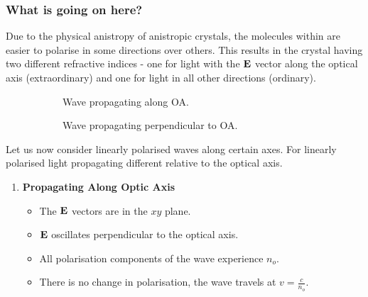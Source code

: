 \documentclass{book}
\begin{document}
{\subsubsection{What is going on here?}
Due to the physical anistropy of anistropic crystals, the molecules within are easier to polarise in some directions over others. This results in the crystal having two different refractive indices - one for light with the $\vb{E}$ vector along the optical axis (extraordinary) and one for light in all other directions (ordinary).
\begin{figure}
	\centering
	\begin{subfigure}{0.4\textwidth}
	\caption{Wave propagating along OA.}
	\end{subfigure}
	\begin{subfigure}{0.4\textwidth}
	\caption{Wave propagating perpendicular to OA.}
	\end{subfigure}
	\caption{}
\end{figure}
\noindent
Let us now consider linearly polarised waves along certain axes. For linearly polarised light propagating different relative to the optical axis.
\begin{enumerate}
	\item \textbf{Propagating Along Optic Axis}
	\begin{itemize}
		\item The $\vb{E}$ vectors are in the $xy$ plane. 
		\item $\vb{E}$ oscillates perpendicular to the optical axis.
		\item All polarisation components of the wave experience $n_o$.
		\item There is no change in polarisation, the wave travels at $v = \frac{c}{n_o}$.
	\end{itemize}

\end{enumerate}}
\end{document}
